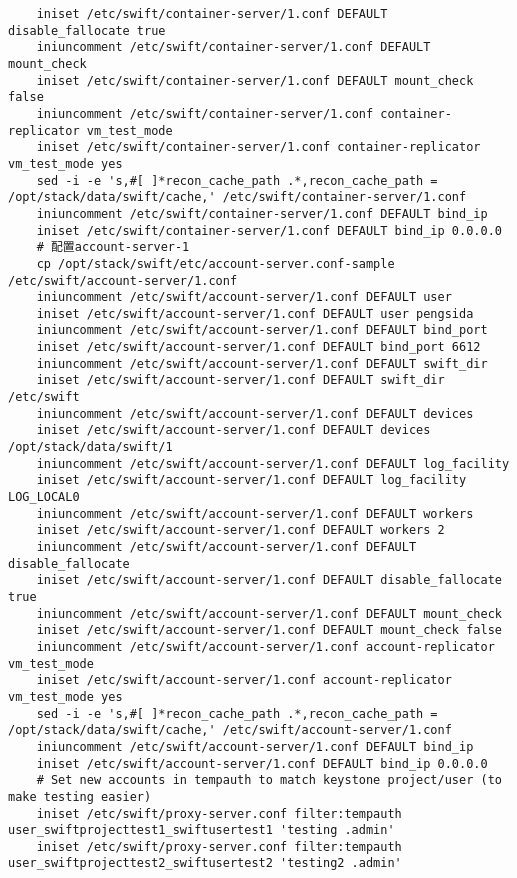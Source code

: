 \documentclass[a4paper,left=1.5cm,right=1.5cm,11pt]{article}
\begin{document}
\begin{lstlisting}
    iniset /etc/swift/container-server/1.conf DEFAULT disable_fallocate true
    iniuncomment /etc/swift/container-server/1.conf DEFAULT mount_check
    iniset /etc/swift/container-server/1.conf DEFAULT mount_check false
    iniuncomment /etc/swift/container-server/1.conf container-replicator vm_test_mode
    iniset /etc/swift/container-server/1.conf container-replicator vm_test_mode yes
    sed -i -e 's,#[ ]*recon_cache_path .*,recon_cache_path = /opt/stack/data/swift/cache,' /etc/swift/container-server/1.conf
    iniuncomment /etc/swift/container-server/1.conf DEFAULT bind_ip
    iniset /etc/swift/container-server/1.conf DEFAULT bind_ip 0.0.0.0
	# 配置account-server-1
	cp /opt/stack/swift/etc/account-server.conf-sample /etc/swift/account-server/1.conf
	iniuncomment /etc/swift/account-server/1.conf DEFAULT user
    iniset /etc/swift/account-server/1.conf DEFAULT user pengsida
    iniuncomment /etc/swift/account-server/1.conf DEFAULT bind_port
    iniset /etc/swift/account-server/1.conf DEFAULT bind_port 6612
    iniuncomment /etc/swift/account-server/1.conf DEFAULT swift_dir
    iniset /etc/swift/account-server/1.conf DEFAULT swift_dir /etc/swift
    iniuncomment /etc/swift/account-server/1.conf DEFAULT devices
    iniset /etc/swift/account-server/1.conf DEFAULT devices /opt/stack/data/swift/1
    iniuncomment /etc/swift/account-server/1.conf DEFAULT log_facility
    iniset /etc/swift/account-server/1.conf DEFAULT log_facility LOG_LOCAL0
    iniuncomment /etc/swift/account-server/1.conf DEFAULT workers
    iniset /etc/swift/account-server/1.conf DEFAULT workers 2
    iniuncomment /etc/swift/account-server/1.conf DEFAULT disable_fallocate
    iniset /etc/swift/account-server/1.conf DEFAULT disable_fallocate true
    iniuncomment /etc/swift/account-server/1.conf DEFAULT mount_check
    iniset /etc/swift/account-server/1.conf DEFAULT mount_check false
    iniuncomment /etc/swift/account-server/1.conf account-replicator vm_test_mode
    iniset /etc/swift/account-server/1.conf account-replicator vm_test_mode yes
    sed -i -e 's,#[ ]*recon_cache_path .*,recon_cache_path = /opt/stack/data/swift/cache,' /etc/swift/account-server/1.conf
    iniuncomment /etc/swift/account-server/1.conf DEFAULT bind_ip
    iniset /etc/swift/account-server/1.conf DEFAULT bind_ip 0.0.0.0
	# Set new accounts in tempauth to match keystone project/user (to make testing easier)
	iniset /etc/swift/proxy-server.conf filter:tempauth user_swiftprojecttest1_swiftusertest1 'testing .admin'
    iniset /etc/swift/proxy-server.conf filter:tempauth user_swiftprojecttest2_swiftusertest2 'testing2 .admin'

\end{lstlisting}
\end{document}
